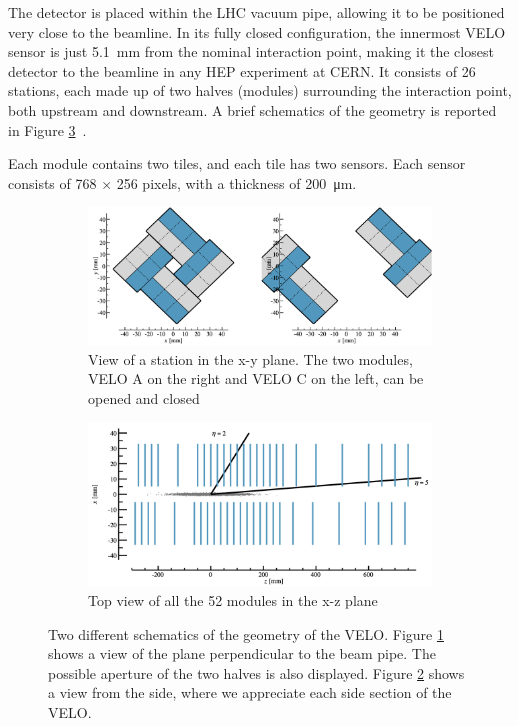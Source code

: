 The detector is placed within the LHC vacuum pipe, allowing it to be positioned very close to the beamline. In its fully closed configuration, the innermost VELO sensor is just \SI{5.1}{\milli\meter} from the nominal interaction point, making it the closest detector to the beamline in any HEP experiment at CERN.
It consists of 26 stations, each made up of two halves (modules) surrounding the interaction point, both upstream and downstream. A brief schematics of the geometry is reported in Figure \ref{fig:velo-geometry}~\cite{LHCbVelo:2019flq}.

Each module contains two tiles, and each tile has two sensors. Each sensor consists of 768 × 256 pixels, with a thickness of \SI{200}{\micro\meter}. 

\begin{figure}
    \centering
    \begin{subfigure}{0.48\textwidth}
    \includegraphics[width=\linewidth]{figures/aperture.png}
    \caption{View of a station in the x-y plane. The two modules, VELO A on the right and VELO C on the left, can be opened and closed}\label{fig_velo-xy}
    \end{subfigure}
    \begin{subfigure}{0.48\textwidth}
    \includegraphics[width=\linewidth]{figures/above_view.png}
    \caption{Top view of all the 52 modules in the x-z plane}\label{fig_velo-side}
    \end{subfigure}
    \caption{Two different schematics of the geometry of the VELO. Figure \ref{fig_velo-xy} shows a view of the plane perpendicular to the beam pipe. The possible aperture of the two halves is also displayed. Figure \ref{fig_velo-side} shows a view from the side, where we appreciate each side section of the VELO.}
    \label{fig:velo-geometry}
\end{figure}

